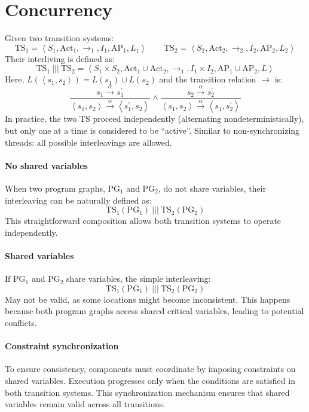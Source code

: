 \section{Concurrency}

Given two transition systems: 
\[\text{TS}_1=\left\langle S_1, \text{Act}_1, \rightarrow_1, I_1,\text{AP}_1, L_1\right\rangle \qquad \text{TS}_2=\left\langle S_2, \text{Act}_2, \rightarrow_2, I_2,\text{AP}_2, L_2\right\rangle\]    
Their interliving is defined as: 
\[\text{TS}_1\:|||\:\text{TS}_2=\left\langle S_1\times S_2, \text{Act}_1 \cup \text{Act}_2, \rightarrow_1, I_1\times I_2,\text{AP}_1\cup \text{AP}_2, L\right\rangle\]
Here,  $L(\left\langle s_1,s_2\right\rangle )= L(s_1) \cup L(s_2)$ and the transition relation $\rightarrow$ is:
\[\dfrac{s_1\overset{\alpha}{\rightarrow}s_1^\prime}{\left\langle s_1,s_2\right\rangle \overset{\alpha}{\rightarrow}\left\langle s_1^\prime,s_2\right\rangle} \land \dfrac{s_2\overset{\alpha}{\rightarrow}s_2^\prime}{\left\langle s_1,s_2\right\rangle \overset{\alpha}{\rightarrow}\left\langle s_1,s_2^\prime\right\rangle}\]
In practice, the two TS proceed independently (alternating nondeterministically), but only one at a time is considered to be “active”. 
Similar to non-synchronizing threads: all possible interleavings are allowed.

\paragraph*{No shared variables}
When two program graphs, $\text{PG}_1$ and $\text{PG}_2$, do not share variables, their interleaving can be naturally defined as:
\[\text{TS}_1(\text{PG}_1)\:|||\: \text{TS}_2(\text{PG}_2)\] 
This straightforward composition allows both transition systems to operate independently.

\paragraph*{Shared variables} 
If $\text{PG}_1$ and $\text{PG}_2$ share variables, the simple interleaving:
\[\text{TS}_1(\text{PG}_1)\:|||\:\text{TS}_2(\text{PG}_2)\] 
May not be valid, as some locations might become inconsistent. 
This happens because both program graphs access shared critical variables, leading to potential conflicts.

\paragraph*{Constraint synchronization}
To ensure consistency, components must coordinate by imposing constraints on shared variables.
Execution progresses only when the conditions are satisfied in both transition systems. 
This synchronization mechanism ensures that shared variables remain valid across all transitions.

